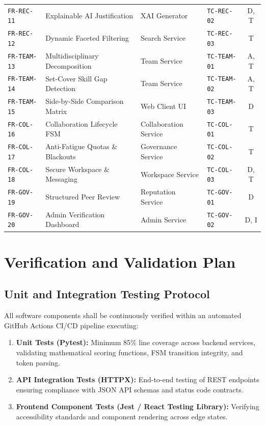 \documentclass[11pt,a4paper]{article}
\begin{document}
\begin{table}[H]
\begin{tabularx}{\textwidth}{@{}l p{4.4cm} l l c@{}}
\texttt{FR-REC-11}  & Explainable AI Justification & XAI Generator & \texttt{TC-REC-02} & D, T \\
\texttt{FR-REC-12}  & Dynamic Faceted Filtering & Search Service & \texttt{TC-REC-03} & T \\
\texttt{FR-TEAM-13} & Multidisciplinary Decomposition & Team Service & \texttt{TC-TEAM-01} & A, T \\
\texttt{FR-TEAM-14} & Set-Cover Skill Gap Detection & Team Service & \texttt{TC-TEAM-02} & A, T \\
\texttt{FR-TEAM-15} & Side-by-Side Comparison Matrix & Web Client UI & \texttt{TC-TEAM-03} & D \\
\texttt{FR-COL-16}  & Collaboration Lifecycle FSM & Collaboration Service & \texttt{TC-COL-01} & T \\
\texttt{FR-COL-17}  & Anti-Fatigue Quotas \& Blackouts & Governance Service & \texttt{TC-COL-02} & T \\
\texttt{FR-COL-18}  & Secure Workspace \& Messaging & Workspace Service & \texttt{TC-COL-03} & D, T \\
\texttt{FR-GOV-19}  & Structured Peer Review & Reputation Service & \texttt{TC-GOV-01} & D \\
\texttt{FR-GOV-20}  & Admin Verification Dashboard & Admin Service & \texttt{TC-GOV-02} & D, I \\
\bottomrule
\end{tabularx}
\end{table}

\clearpage
\section{Verification and Validation Plan}
\label{sec:vv_plan}

\subsection{Unit and Integration Testing Protocol}
All software components shall be continuously verified within an automated GitHub Actions CI/CD pipeline executing:
\begin{enumerate}[label=\textbf{(\arabic*)},noitemsep]
    \item \textbf{Unit Tests (Pytest):} Minimum 85\% line coverage across backend services, validating mathematical scoring functions, FSM transition integrity, and token parsing.
    \item \textbf{API Integration Tests (HTTPX):} End-to-end testing of REST endpoints ensuring compliance with JSON API schemas and status code contracts.
    \item \textbf{Frontend Component Tests (Jest / React Testing Library):} Verifying accessibility standards and component rendering across edge states.
\end{enumerate}
\end{document}
